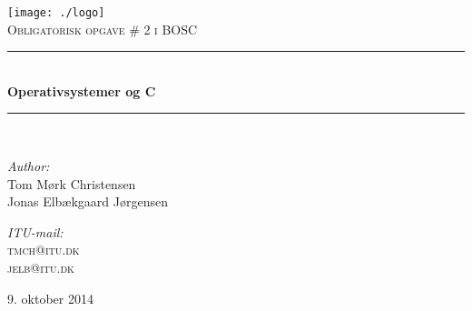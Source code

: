 \begin{titlepage}
\begin{center}


\texttt{[image: ./logo]}\\[1cm]

\textsc{\Large Obligatorisk opgave \# 2 i BOSC}\\[0.5cm]

\rule{\linewidth}{0.5mm} \\[0.3cm]
{ \LARGE \bfseries Operativsystemer og C\\[0.3cm]}
\rule{\linewidth}{0.5mm} \\[1.5cm]

\begin{minipage}{0.5\textwidth}
\begin{flushleft} \large
\emph{Author:}\\
Tom Mørk Christensen\\
Jonas Elbækgaard Jørgensen
\end{flushleft}
\end{minipage}
\begin{minipage}{0.3\textwidth}
\begin{flushright} \large
\emph{ITU-mail:} \\
\textsc{tmch@itu.dk} \\
\textsc{jelb@itu.dk}
\end{flushright}
\end{minipage}

\vfill

\large 9. oktober 2014

\end{center}
\end{titlepage}